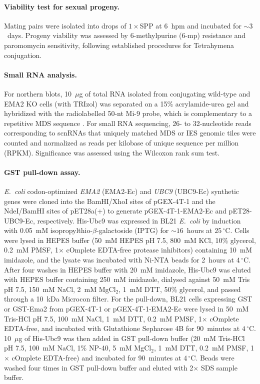 \documentclass[11pt]{article}
\begin{document}
\paragraph{Viability test for sexual progeny.}
Mating pairs were isolated into drops of $1\times$SPP at 6~hpm and
incubated for ${\sim}3$~days. Progeny viability was assessed by 6-methylpurine
(6-mp) resistance and paromomycin sensitivity, following established
procedures for Tetrahymena conjugation.

\paragraph{Small RNA analysis.}
For northern blots, 10~$\mu$g of total RNA isolated from conjugating
wild-type and EMA2 KO cells (with TRIzol) was separated on a 15\%
acrylamide-urea gel and hybridized with the radiolabelled 50-nt Mi-9
probe, which is complementary to a repetitive MDS sequence
\citep{aronica2008ema1}. For small RNA sequencing, 26- to 32-nucleotide
reads corresponding to scnRNAs \citep{schoeberl2012biased} that uniquely
matched MDS or IES genomic tiles were counted and normalized as
reads per kilobase of unique sequence per million (RPKM). Significance was
assessed using the Wilcoxon rank sum test.

\paragraph{GST pull-down assay.}
\emph{E.~coli} codon-optimized \emph{EMA2} (EMA2-Ec) and \emph{UBC9}
(UBC9-Ec) synthetic genes were cloned into the BamHI/XhoI sites of
pGEX-4T-1 and the NdeI/BamHI sites of pET28a(+) to generate
pGEX-4T-1-EMA2-Ec and pET28-UBC9-Ec, respectively. His-Ubc9 was expressed
in BL21 \emph{E.~coli} by induction with 0.05~mM
isopropylthio-$\beta$-galactoside (IPTG) for ${\sim}16$~hours at
$25\,^{\circ}$C. Cells were lysed in HEPES buffer (50~mM HEPES pH 7.5,
800~mM KCl, 10\% glycerol, 0.2~mM PMSF, 1$\times$ cOmplete EDTA-free
protease inhibitors) containing 10~mM imidazole, and the lysate was
incubated with Ni-NTA beads for 2~hours at $4\,^{\circ}$C. After four
washes in HEPES buffer with 20~mM imidazole, His-Ubc9 was eluted with
HEPES buffer containing 250~mM imidazole, dialysed against 50~mM Tris
pH 7.5, 150~mM NaCl, 2~mM MgCl$_2$, 1~mM DTT, 50\% glycerol, and passed
through a 10~kDa Microcon filter. For the pull-down, BL21 cells expressing
GST or GST-Ema2 from pGEX-4T-1 or pGEX-4T-1-EMA2-Ec were lysed in 50~mM
Tris-HCl pH 7.5, 100~mM NaCl, 1~mM DTT, 0.2~mM PMSF, 1$\times$ cOmplete
EDTA-free, and incubated with Glutathione Sepharose 4B for 90~minutes at
$4\,^{\circ}$C. 10~$\mu$g of His-Ubc9 was then added in GST pull-down
buffer (20~mM Tris-HCl pH 7.5, 100~mM NaCl, 1\% NP-40, 5~mM MgCl$_2$,
1~mM DTT, 0.2~mM PMSF, 1$\times$ cOmplete EDTA-free) and incubated for
90~minutes at $4\,^{\circ}$C. Beads were washed four times in GST
pull-down buffer and eluted with 2$\times$ SDS sample buffer.
\end{document}
